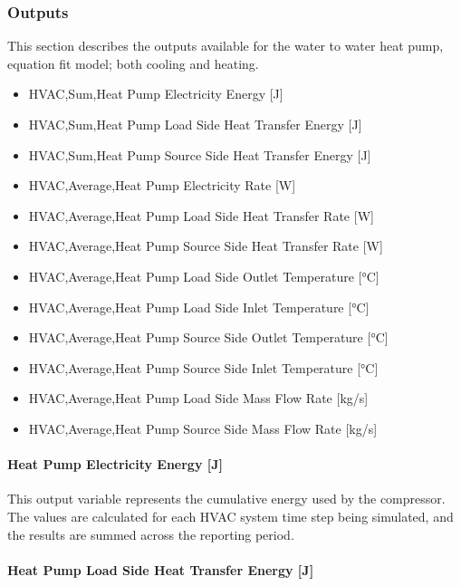 \subsubsection{Outputs}\label{outputs-12-004}

This section describes the outputs available for the water to water heat pump, equation fit model; both cooling and heating.

\begin{itemize}
\item
  HVAC,Sum,Heat Pump Electricity Energy {[}J{]}
\item
  HVAC,Sum,Heat Pump Load Side Heat Transfer Energy {[}J{]}
\item
  HVAC,Sum,Heat Pump Source Side Heat Transfer Energy {[}J{]}
\item
  HVAC,Average,Heat Pump Electricity Rate {[}W{]}
\item
  HVAC,Average,Heat Pump Load Side Heat Transfer Rate {[}W{]}
\item
  HVAC,Average,Heat Pump Source Side Heat Transfer Rate {[}W{]}
\item
  HVAC,Average,Heat Pump Load Side Outlet Temperature {[}°C{]}
\item
  HVAC,Average,Heat Pump Load Side Inlet Temperature {[}°C{]}
\item
  HVAC,Average,Heat Pump Source Side Outlet Temperature {[}°C{]}
\item
  HVAC,Average,Heat Pump Source Side Inlet Temperature {[}°C{]}
\item
  HVAC,Average,Heat Pump Load Side Mass Flow Rate {[}kg/s{]}
\item
  HVAC,Average,Heat Pump Source Side Mass Flow Rate {[}kg/s{]}
\end{itemize}

\paragraph{Heat Pump Electricity Energy {[}J{]}}\label{water-to-water-heat-pump-electric-energy-j}

This output variable represents the cumulative energy used by the compressor. The values are calculated for each HVAC system time step being simulated, and the results are summed across the reporting period.

\paragraph{Heat Pump Load Side Heat Transfer Energy {[}J{]}}\label{water-to-water-heat-pump-load-side-heat-transfer-energy-j}


